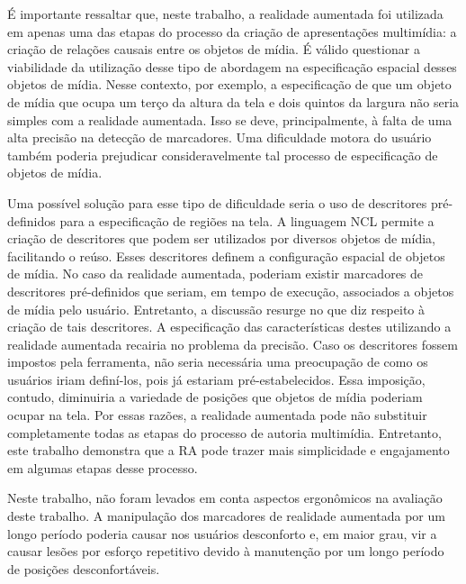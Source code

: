 \documentclass[../main.tex]{subfiles}
\begin{document}
É importante ressaltar que, neste trabalho, a realidade aumentada foi utilizada em apenas uma das etapas do processo da criação de apresentações multimídia: a criação de relações causais entre os objetos de mídia. É válido questionar a viabilidade da utilização desse tipo de abordagem na especificação espacial desses objetos de mídia. Nesse contexto, por exemplo, a especificação de que um objeto de mídia que ocupa um terço da altura da tela e dois quintos da largura não seria simples com a realidade aumentada. Isso se deve, principalmente, à falta de uma alta precisão na detecção de marcadores. Uma dificuldade motora do usuário também poderia prejudicar consideravelmente tal processo de especificação de objetos de mídia. 

Uma possível solução para esse tipo de dificuldade seria o uso de descritores pré-definidos para a especificação de regiões na tela. A linguagem NCL permite a criação de descritores que podem ser utilizados por diversos objetos de mídia, facilitando o reúso. Esses descritores definem a configuração espacial de objetos de mídia. No caso da realidade aumentada, poderiam existir marcadores de descritores pré-definidos que seriam, em tempo de execução, associados a objetos de mídia pelo usuário. Entretanto, a discussão resurge no que diz respeito à criação de tais descritores. A especificação das características destes utilizando a realidade aumentada recairia no problema da precisão. Caso os descritores fossem impostos pela ferramenta, não seria necessária uma preocupação de como os usuários iriam definí-los, pois já estariam pré-estabelecidos. Essa imposição, contudo, diminuiria a variedade de posições que objetos de mídia poderiam ocupar na tela. Por essas razões, a realidade aumentada pode não substituir completamente todas as etapas do processo de autoria multimídia. Entretanto, este trabalho demonstra que a RA pode trazer mais simplicidade e engajamento em algumas etapas desse processo.

Neste trabalho, não foram levados em conta aspectos ergonômicos na avaliação deste trabalho. A manipulação dos marcadores de realidade aumentada por um longo período poderia causar nos usuários desconforto e, em maior grau, vir a causar lesões por esforço repetitivo devido à manutenção por um longo período de posições desconfortáveis.
\end{document}
